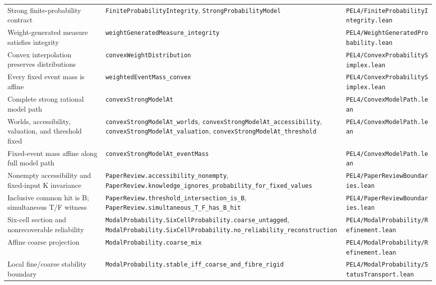 \begin{longtable}{@{}p{}p{}p{}@{}}
\addlinespace
Strong finite-probability contract & \texttt{FiniteProbabilityIntegrity}, \texttt{StrongProbabilityModel} & \texttt{PEL4/FiniteProbabilityIntegrity.lean}\\
\addlinespace
Weight-generated measure satisfies integrity & \texttt{weightGeneratedMeasure\_integrity} & \texttt{PEL4/WeightGeneratedProbability.lean}\\
\addlinespace
Convex interpolation preserves distributions & \texttt{convexWeightDistribution} & \texttt{PEL4/ConvexProbabilitySimplex.lean}\\
\addlinespace
Every fixed event mass is affine & \texttt{weightedEventMass\_convex} & \texttt{PEL4/ConvexProbabilitySimplex.lean}\\
\addlinespace
Complete strong rational model path & \texttt{convexStrongModelAt} & \texttt{PEL4/ConvexModelPath.lean}\\
\addlinespace
Worlds, accessibility, valuation, and threshold fixed & \texttt{convexStrongModelAt\_worlds}, \texttt{convexStrongModelAt\_accessibility}, \texttt{convexStrongModelAt\_valuation}, \texttt{convexStrongModelAt\_threshold} & \texttt{PEL4/ConvexModelPath.lean}\\
\addlinespace
Fixed-event mass affine along full model path & \texttt{convexStrongModelAt\_eventMass} & \texttt{PEL4/ConvexModelPath.lean}\\
\addlinespace
Nonempty accessibility and fixed-input K invariance & \texttt{PaperReview.accessibility\_nonempty}, \texttt{PaperReview.knowledge\_ignores\_probability\_for\_fixed\_values} & \texttt{PEL4/PaperReviewBoundaries.lean}\\
\addlinespace
Inclusive common hit is B; simultaneous T/F witness & \texttt{PaperReview.threshold\_intersection\_is\_B}, \texttt{PaperReview.simultaneous\_T\_F\_has\_B\_hit} & \texttt{PEL4/PaperReviewBoundaries.lean}\\
\addlinespace
Six-cell section and nonrecoverable reliability & \texttt{ModalProbability.SixCellProbability.coarse\_untagged}, \texttt{ModalProbability.SixCellProbability.no\_reliability\_reconstruction} & \texttt{PEL4/ModalProbability/Refinement.lean}\\
\addlinespace
Affine coarse projection & \texttt{ModalProbability.coarse\_mix} & \texttt{PEL4/ModalProbability/Refinement.lean}\\
\addlinespace
Local fine/coarse stability boundary & \texttt{ModalProbability.stable\_iff\_coarse\_and\_fibre\_rigid} & \texttt{PEL4/ModalProbability/StatusTransport.lean}\\

\end{longtable}

